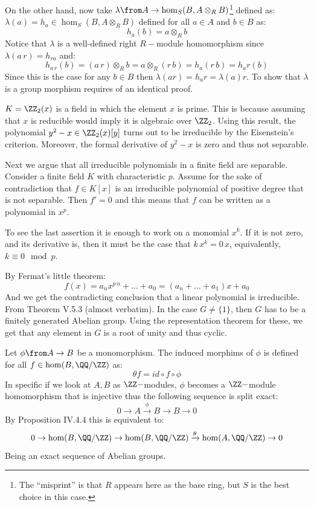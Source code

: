 On the other hand, now take $\lambda \from A \to \hom_S(B,A\otimes_R B)$\footnote{The ``misprint''  is that $R$ appears here as the base ring, but $S$ is the best choice in this case.} defined as: $\lambda (a) = h_a\in \hom_S(B,A\otimes_R B)$ defined for all $a\in A$ and $b\in B$ as: 
$$h_a(b) = a \otimes_R b $$
Notice that $\lambda$ is a well-defined right $R-$module homomorphism since $\lambda(a\,r) = h_{ra}$ and:
$$h_{a\,r}(b) = (a\, r) \otimes_ R b = a \otimes_ R (r\,b)= h_a(r\, b) = h_ar(b)$$
Since this is the case for any $b\in B$ then $\lambda(ar)= h_a r= \lambda(a)r$. To show that $\lambda$ is a group morphism requires of  an identical proof.

$K=\ZZ_2(x)$ is a field in which the element $x$ is prime. This is because assuming that $x$ is reducible would imply it is algebraic over $\ZZ_2$. Using this result, the polynomial $y^2- x\in \ZZ_2(x)[y]$ turns out to be irreducible by the Eisenstein's criterion. Moreover, the formal derivative of $y^2-x$ is zero and thus not separable.

Next we argue that all irreducible polynomials in a finite field are separable. Consider a finite field $K$ with characteristic $p$. Assume for the sake of contradiction that $f\in K[x]$ is an irreducible polynomial of positive degree that is not separable. Then $f'=0$ and this means that $f$ can be written as a polynomial in $x^p$. 

To see the last assertion it is enough to work on a monomial $x^k$. If it is not zero, and its derivative is, then it must be the case that $k\, x^{k}=0\, x$, equivalently, $k\equiv 0 \mod p$.

By Fermat's little theorem:
$$f(x) = a_n x^{p\,n}+\ldots + a_0 = (a_n+\ldots +a_1)x +a_0$$
And we get the contradicting conclusion that a linear polynomial is irreducible.
From Theorem V.5.3 (almost verbatim). In the case $G\neq \{1\}$, then $G$ has to be a finitely generated Abelian group. Using the representation theorem for these, we get that any element in $G$ is a root of unity and thus cyclic.

Let $\phi \from A\to B$ be a monomorphism. The induced morphims of $\phi$ is defined for all $f\in \hom(B,\QQ/\ZZ)$ as: 
$$\theta f= id\circ f\circ \phi$$
In specific if we look at $A,B$ as $\ZZ-$modules,  $\phi$ becomes a $\ZZ-$module homomorphism that is injective thus the following sequence is split exact:
$$0\to A \xrightarrow \phi B \to B \to 0$$
By Proposition IV.4.4 this is equivalent to:
$$0\to \hom(B,\QQ/\ZZ) \to \hom(B,\QQ/\ZZ) \xrightarrow \theta \hom(A,\QQ/\ZZ) \to 0$$
Being an exact sequence of Abelian groups.

